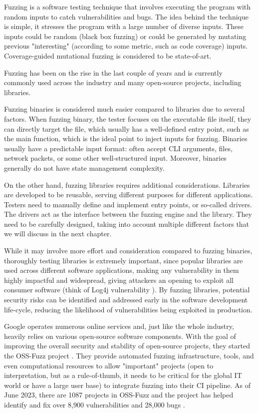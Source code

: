 \documentclass[a4paper,11pt,oneside]{report}
\begin{document}
Fuzzing is a software testing technique that involves executing the 
program with random inputs to catch vulnerabilities and bugs. The idea behind
the technique is simple, it stresses the program with a large number of diverse
inputs. These inputs could be random (black box fuzzing) or could be generated 
by mutating previous "interesting" (according to some metric, such as code
coverage) inputs. Coverage-guided mutational fuzzing is considered to be
state-of-art.

Fuzzing has been on the rise in the last couple of years and is currently 
commonly used across the industry and many open-source projects, including libraries. 

Fuzzing binaries is considered much easier compared to libraries due to several factors.
When fuzzing binary, the tester focuses on the executable file itself, they can directly
target the file, which usually has a well-defined entry point, such as the main function, 
which is the ideal point to inject inputs for fuzzing. Binaries usually have a predictable
input format: often accept CLI arguments, files, network packets, or some other 
well-structured input. Moreover, binaries generally do not have state management complexity.

On the other hand, fuzzing libraries requires additional considerations. Libraries
are developed to be reusable, serving different purposes for different applications. 
Testers need to manually define and implement entry points, or so-called drivers.
The drivers act as the interface between the fuzzing engine and the library.
They need to be carefully designed, taking into account multiple different factors
that we will discuss in the next chapter.

While it may involve more effort and consideration compared to fuzzing binaries, 
thoroughly testing libraries is extremely important, since popular libraries 
are used across different software applications, making any vulnerability in them
highly impactful and widespread, giving attackers an opening to exploit all consumer
software (think of Log4j vulnerability \cite{log4j}). By fuzzing libraries, potential 
security risks can be identified and addressed early in the software 
development life-cycle, reducing the likelihood of vulnerabilities being exploited in production.

Google operates numerous online services and, just like the whole industry, 
heavily relies on various open-source software components. With the goal
of improving the overall security and stability of open-source projects,
they started the OSS-Fuzz project \cite{ossfuzz}. They provide automated fuzzing
infrastructure, tools, and even computational resources to allow "important" 
projects (open to interpretation, but as a rule-of-thumb, it needs to be critical
for the global IT world or have a large user base) to integrate fuzzing into their CI pipeline. 
As of June 2023, there are 1087 projects in OSS-Fuzz and the project has helped identify and 
fix over 8,900 vulnerabilities and 28,000 bugs \cite{ossfuzz-trophies}.
\end{document}
